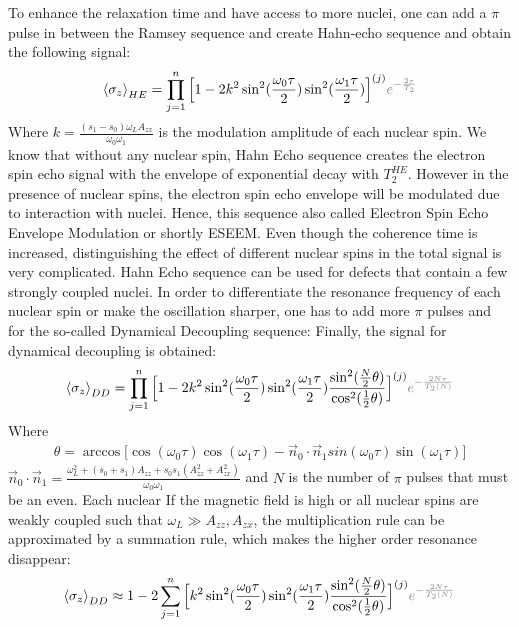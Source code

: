 \documentclass[%
 reprint,
superscriptaddress,
 amsmath,amssymb,
 aps,
]{revtex4-2}
\begin{document}
To enhance the relaxation time and have access to more nuclei, one can add a $\pi$ pulse in between the Ramsey sequence and create Hahn-echo sequence and obtain the following signal:
\begin{gather}
	\expval{\sigma_z}_{HE} = \prod_{j=1}^n \Big[1 - 2 k^2 
	\sin^2(\frac{\omega_0 \tau}{2}) \sin^2(\frac{\omega_1 \tau}{2})\Big]^{(j)} \textcolor{gray}{ e^{-\frac{2\tau}{T_2}}}
\end{gather}
Where $k = \frac{(s_1-s_0)\omega_L A_{zx}}{\omega_0 \omega_1}$ is the modulation amplitude of each nuclear spin. We know that without any nuclear spin, Hahn Echo sequence creates the electron spin echo signal with the envelope of exponential decay with $T_2^{HE}$. However in the presence of nuclear spins, the electron spin echo envelope will be modulated due to interaction with nuclei. Hence, this sequence also called Electron Spin Echo Envelope Modulation or shortly ESEEM. Even though the coherence time is increased, distinguishing the effect of different nuclear spins in the total signal is very complicated. Hahn Echo sequence can be used for defects that contain a few strongly coupled nuclei. In order to differentiate the resonance frequency of each nuclear spin or make the oscillation sharper, one has to add more $\pi$ pulses and for the so-called Dynamical Decoupling sequence:
Finally, the signal for dynamical decoupling is obtained:
\begin{gather}
	\expval{\sigma_z}_{DD} =
	\prod_{j=1}^n \Big[1- 2 k^2  
	\sin^2(\frac{\omega_0 \tau}{2}) \sin^2(\frac{\omega_1 \tau}{2}) \frac{\sin^2(\frac{N}{2} \theta)}{\cos^2(\frac{1}{2}\theta)}  \Big]^{(j)} \textcolor{gray}{ e^{-\frac{2N\tau}{T_2(N)}}} 
\end{gather}
Where
\begin{gather}
	\theta=  \arccos\Big[\cos(\omega_0 \tau) \cos(\omega_1 \tau)- \vec{n}_0 \cdot \vec{n}_1 sin(\omega_0 \tau) \sin(\omega_1 \tau) \Big]
\end{gather}
$\vec{n}_0 \cdot \vec{n}_1 = \frac{\omega_L^2+(s_0+s_1)A_{zz}+s_0 s_1 (A_{zz}^2+A_{zx}^2)}{\omega_0 \omega_1}$ and $N$ is the number of $\pi$ pulses that must be an even. Each nuclear 
If the magnetic field is high or all nuclear spins are weakly coupled such that $\omega_L \gg A_{zz}, A_{zx}$, the multiplication rule can be approximated by a summation rule, which makes the higher order resonance disappear:
\begin{gather}
	\expval{\sigma_z}_{DD} \approx 1 -2
	\sum_{j=1}^n \Big[ k^2 	 \sin^2(\frac{\omega_0 \tau}{2}) \sin^2(\frac{\omega_1 \tau}{2}) \frac{\sin^2(\frac{N}{2} \theta)}{\cos^2(\frac{1}{2}\theta)}  \Big]^{(j)} \textcolor{gray}{ e^{-\frac{2N\tau}{T_2(N)}}} 
\end{gather}
\end{document}
